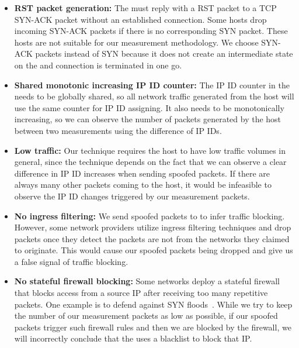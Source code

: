 \begin{itemize}
    \item \textbf{RST packet generation:}
    The {} must reply with a RST packet to a TCP SYN-ACK packet without an
    established connection. Some hosts drop incoming SYN-ACK packets if there
    is no corresponding SYN packet. These hosts are not suitable for our
    measurement methodology. We choose SYN-ACK packets instead of SYN because
    it does not create an intermediate state on the {} and
    connection is terminated in one go.

    \item \textbf{Shared monotonic increasing IP ID counter:}
    The IP ID counter in the {} needs to be globally shared, so all
    network traffic generated from the host will use the same counter for IP
    ID assigning. It also needs to be monotonically increasing, so we can
    observe the number of packets generated by the host between two measurements using
    the difference of IP IDs.
    \item \textbf{Low traffic:}
    Our technique requires the host to have low traffic volumes
    in general, since the technique depends on the fact
    that we can observe a clear difference in IP ID increases when sending
    spoofed packets. If there are always many other
    packets coming to the host, it would be infeasible to observe the IP ID
    changes triggered by our measurement packets.

    \item \textbf{No ingress filtering:}
    We send spoofed packets to {} to infer traffic blocking.
    However, some network providers utilize ingress filtering techniques and
    drop packets once they detect the packets are not from the networks they
    claimed to originate. This would cause our spoofed packets being dropped
    and give us a false signal of traffic blocking.

    \item \textbf{No stateful firewall blocking:}
    Some networks deploy a stateful firewall that blocks access from a source IP
    after receiving too many repetitive packets. One example is to defend
    against SYN floods~\cite{lemon2002resisting}. While we try to keep the number
    of our measurement packets as low as possible, if our spoofed packets trigger such
    firewall rules and then we are blocked by the firewall, we will incorrectly
    conclude that the {} uses a blacklist to block that IP.
\end{itemize}

